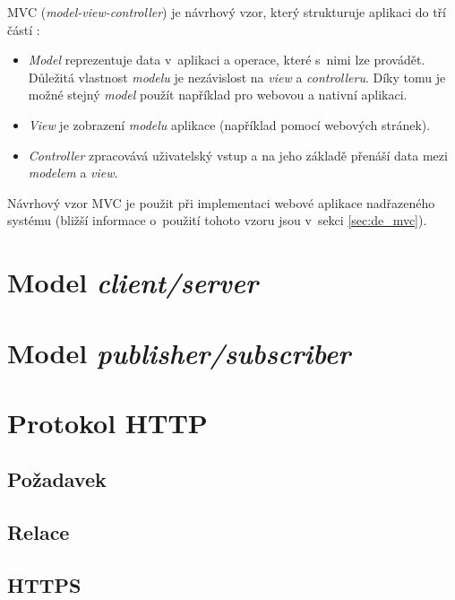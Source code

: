 MVC (\textit{model-view-controller}) je návrhový vzor, který strukturuje aplikaci do tří částí \cite{mvc_dalling}:

\begin{itemize}
    \item \textit{Model} reprezentuje data v~aplikaci a operace, které s~nimi lze provádět. Důležitá vlastnost \textit{modelu} je nezávislost na \textit{view} a \textit{controlleru}. Díky tomu je možné stejný \textit{model} použít například pro webovou a nativní aplikaci.
    \item \textit{View} je zobrazení \textit{modelu} aplikace (například pomocí webových stránek).
    \item \textit{Controller} zpracovává uživatelský vstup a na jeho základě přenáší data mezi \textit{modelem} a \textit{view}.
\end{itemize}

Návrhový vzor MVC je použit při implementaci webové aplikace nadřazeného systému (bližší informace o~použití tohoto vzoru jsou v~sekci \ref{sec:de_mvc}).

\section{Model \textit{client/server}}

\section{Model \textit{publisher/subscriber}}

\section{Protokol HTTP}

\subsection{Požadavek}

\subsection{Relace}

\subsection{HTTPS}


